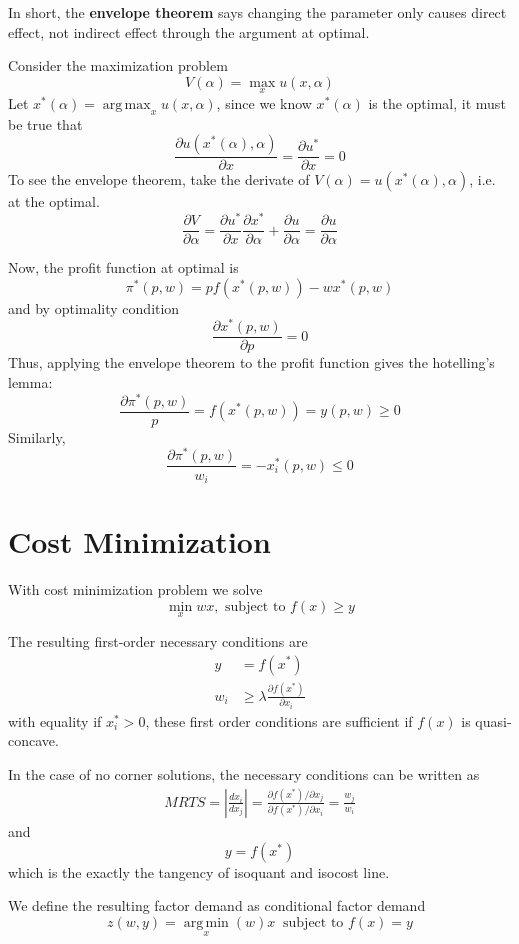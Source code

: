 \documentclass[twocolumn, fleqn]{article}
\newcommand{\argmax}{\operatorname*{arg\,max}}
\newcommand{\argmin}{\operatorname*{arg\,min}}
\begin{document}
			In short, the \textbf{envelope theorem} says changing the parameter only causes direct effect, not indirect effect through the argument at optimal.
			
			Consider the maximization problem 
			\[V(\alpha) = \max_x u(x,\alpha)\]
			Let $x^\ast (\alpha) = \argmax_x u(x,\alpha)$, since we know $x^\ast(\alpha)$ is the optimal, it must be true that 
			\[\frac{\partial u(x^\ast(\alpha), \alpha)}{\partial x}=\frac{\partial u^\ast}{\partial x}=0\]
			To see the envelope theorem, take the derivate of $V(\alpha)=u(x^\ast (\alpha), \alpha)$, i.e. at the optimal.
			\[\frac{\partial V}{\partial \alpha}=\frac{\partial u^\ast}{\partial x} \frac{\partial x^\ast}{\partial \alpha}+\frac{\partial u}{\partial \alpha}=\frac{\partial u}{\partial \alpha}\] 
			
			
			Now, the profit function at optimal is 
			\[\pi^\ast (p,w) = pf(x^\ast(p,w)) - wx^\ast(p,w) \]
			and by optimality condition
			\[\frac{\partial x^\ast(p,w)}{\partial p}=0\]
			Thus, applying the envelope theorem to the profit function gives the hotelling's lemma:
			\[\frac{\partial \pi^\ast (p,w)}{p}= f(x^\ast(p,w)) = y(p,w) \geq 0\]
			Similarly, 
			\[\frac{\partial \pi^\ast (p,w)}{w_i}=-x^\ast_i(p,w) \leq 0\]
			
			
	\section{Cost Minimization}
	
		With cost minimization problem we solve
		\[ \min_{x} w x, \text{ subject to } f(x) \geq y \]
		
		The resulting first-order necessary conditions are
		\begin{align*}
			y &= f(x^\ast)\\
			w_i &\geq \lambda \frac{\partial f(x^\ast)}{\partial x_i}
		\end{align*}
		with equality if $x_i^\ast >0$, these first order conditions are sufficient if $f(x)$ is quasi-concave.
		
		In the case of no corner solutions, the necessary conditions can be written as 
		\begin{align*}
			MRTS = \left| \frac{dx_i}{dx_j}\right| = \frac{\partial f(x^\ast)/\partial x_j}{\partial f(x^\ast)/\partial x_i} = \frac{w_j}{w_i}
		\end{align*}
		and 
		\[y = f(x^\ast)\]
		which is the exactly the tangency of isoquant and isocost line.
		
		We define the resulting factor demand as conditional factor demand
		\[z(w,y) = \argmin_x (w)x \ \text{ subject to } f(x) = y\]
		
\end{document}
